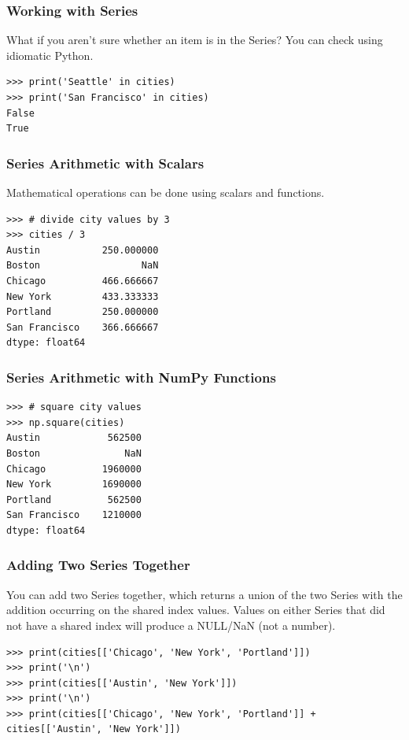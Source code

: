 \begin{frame}[fragile]\frametitle{Working with Series}
What if you aren't sure whether an item is in the Series? You can check using idiomatic Python.
\begin{lstlisting}
>>> print('Seattle' in cities)
>>> print('San Francisco' in cities)
False
True
\end{lstlisting}
\end{frame}

\begin{frame}[fragile]\frametitle{Series Arithmetic with Scalars}
Mathematical operations can be done using scalars and functions.
\begin{lstlisting}
>>> # divide city values by 3
>>> cities / 3
Austin           250.000000
Boston                  NaN
Chicago          466.666667
New York         433.333333
Portland         250.000000
San Francisco    366.666667
dtype: float64
\end{lstlisting}
\end{frame}

\begin{frame}[fragile]\frametitle{Series Arithmetic with NumPy Functions}
\begin{lstlisting}
>>> # square city values
>>> np.square(cities)
Austin            562500
Boston               NaN
Chicago          1960000
New York         1690000
Portland          562500
San Francisco    1210000
dtype: float64
\end{lstlisting}
\end{frame}

\begin{frame}[fragile]\frametitle{Adding Two Series Together}
You can add two Series together, which returns a union of the two Series with the addition occurring on the shared index values. Values on either Series that did not have a shared index will produce a NULL/NaN (not a number).
\begin{lstlisting}
>>> print(cities[['Chicago', 'New York', 'Portland']])
>>> print('\n')
>>> print(cities[['Austin', 'New York']])
>>> print('\n')
>>> print(cities[['Chicago', 'New York', 'Portland']] + cities[['Austin', 'New York']])
\end{lstlisting}
\end{frame}

